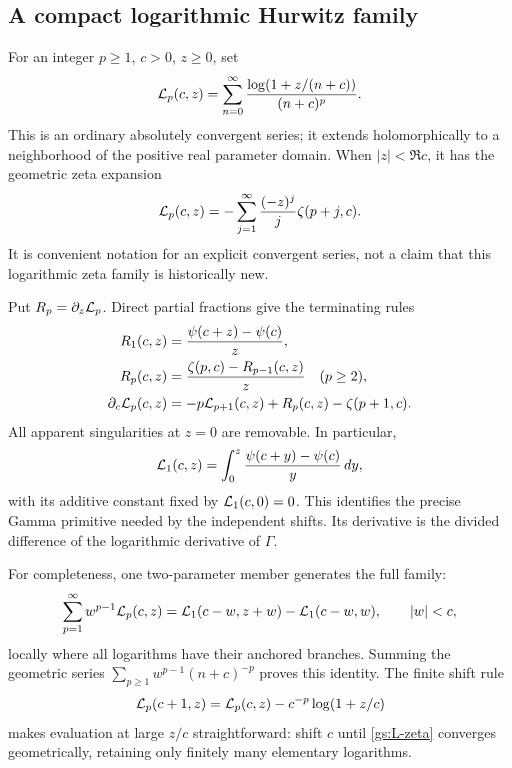 \documentclass[11pt,letterpaper]{article}
\numberwithin{equation}{section}
\theoremstyle{definition}
\theoremstyle{remark}
\begin{document}
\subsection{A compact logarithmic Hurwitz family}

For an integer $p\ge1$, $c>0$, $z\ge0$, set
\begin{equation}\label{gs:L-definition}
 \mathcal L_p(c,z)=\sum_{n=0}^\infty
       \frac{\log(1+z/(n+c))}{(n+c)^p}.
\end{equation}
This is an ordinary absolutely convergent series; it extends
holomorphically to a neighborhood of the positive real parameter
domain.  When $|z|<\Re c$, it has the geometric zeta expansion
\begin{equation}\label{gs:L-zeta}
 \mathcal L_p(c,z)=-\sum_{j=1}^\infty
                    \frac{(-z)^j}{j}\zeta(p+j,c).
\end{equation}
It is convenient notation for an explicit convergent series, not a
claim that this logarithmic zeta family is historically new.

Put $R_p=\partial_z\mathcal L_p$.  Direct partial fractions give the
terminating rules
\begin{align}
 R_1(c,z)&=\frac{\psi(c+z)-\psi(c)}z,\label{gs:R1}\\
 R_p(c,z)&=\frac{\zeta(p,c)-R_{p-1}(c,z)}z\quad(p\ge2),\label{gs:Rp}\\
 \partial_c\mathcal L_p(c,z)
 &=-p\mathcal L_{p+1}(c,z)+R_p(c,z)-\zeta(p+1,c).
 \label{gs:L-derivative}
\end{align}
All apparent singularities at $z=0$ are removable.  In particular,
\begin{equation}\label{gs:Gamma-primitive}
 \mathcal L_1(c,z)=\int_0^z\frac{\psi(c+y)-\psi(c)}y\,dy,
\end{equation}
with its additive constant fixed by $\mathcal L_1(c,0)=0$.
This identifies the precise Gamma primitive needed by the independent
shifts.  Its derivative is the divided difference of the logarithmic
derivative of $\Gamma$.

For completeness, one two-parameter member generates the full family:
\begin{equation}\label{gs:L-generator}
 \sum_{p=1}^\infty w^{p-1}\mathcal L_p(c,z)
 =\mathcal L_1(c-w,z+w)-\mathcal L_1(c-w,w),\qquad |w|<c,
\end{equation}
locally where all logarithms have their anchored branches.  Summing
the geometric series $\sum_{p\ge1}w^{p-1}(n+c)^{-p}$ proves this
identity.  The finite shift rule
\begin{equation}\label{gs:L-shift}
 \mathcal L_p(c+1,z)=\mathcal L_p(c,z)-c^{-p}\log(1+z/c)
\end{equation}
makes evaluation at large $z/c$ straightforward: shift $c$ until
\eqref{gs:L-zeta} converges geometrically, retaining only finitely
many elementary logarithms.
\end{document}

